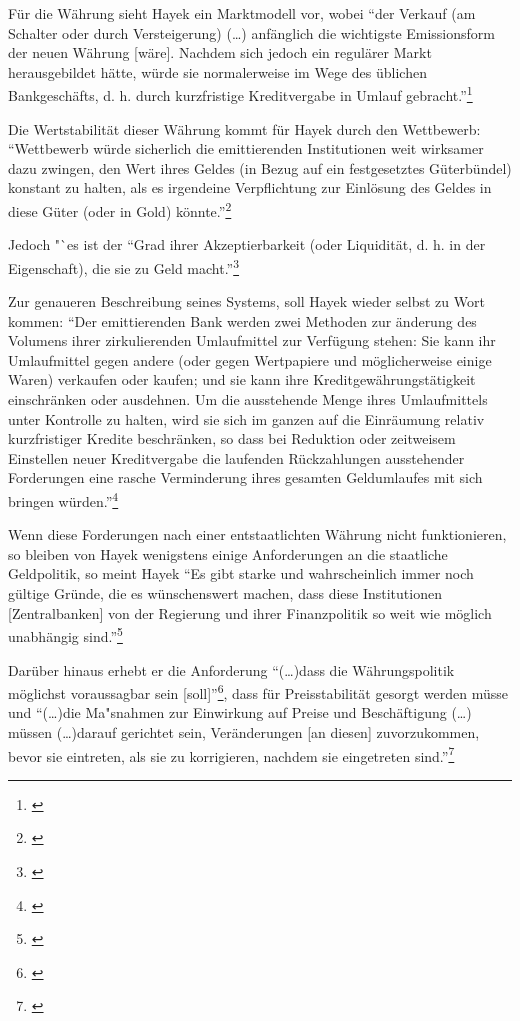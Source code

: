 \documentclass[
        onecolumn,
        a4paper,
        abstracton,
        parskip=half
        ,final
        ]{scrartcl}
\begin{document}
F{\"u}r die W{\"a}hrung sieht Hayek ein Marktmodell vor, wobei "`der Verkauf (am Schalter oder durch Versteigerung) (\ldots) anf{\"a}nglich die wichtigste Emissionsform der neuen W{\"a}hrung [w{\"a}re]. Nachdem sich jedoch ein regul{\"a}rer Markt herausgebildet h{\"a}tte, w{\"u}rde sie normalerweise im Wege des {\"u}blichen Bankgesch{\"a}fts, d. h. durch kurzfristige Kreditvergabe in Umlauf gebracht."'\footnote[70]{\citep*[S.31]{Hayek1977}}

Die Wertstabilit{\"a}t dieser W{\"a}hrung kommt f{\"u}r Hayek durch den Wettbewerb: "`Wettbewerb w{\"u}rde sicherlich die emittierenden Institutionen weit wirksamer dazu zwingen, den Wert ihres Geldes (in Bezug auf ein festgesetztes G{\"u}terb{\"u}ndel) konstant zu halten, als es irgendeine Verpflichtung zur Einl{\"o}sung des Geldes in diese G{\"u}ter (oder in Gold) k{\"o}nnte."'\footnote[71]{\citep*[S.32]{Hayek1977}}

Jedoch "`es ist der "`Grad ihrer Akzeptierbarkeit (oder Liquidit{\"a}t, d. h. in der Eigenschaft), die sie zu Geld macht."'\footnote[72]{\citep*[S.40]{Hayek1977}}

Zur genaueren Beschreibung seines Systems, soll Hayek wieder selbst zu Wort kommen: "`Der emittierenden Bank werden zwei Methoden zur {\"a}nderung des Volumens ihrer zirkulierenden Umlaufmittel zur Verf{\"u}gung stehen: Sie kann ihr Umlaufmittel gegen andere (oder gegen Wertpapiere und m{\"o}glicherweise einige Waren) verkaufen oder kaufen; und sie kann ihre Kreditgew{\"a}hrungst{\"a}tigkeit einschr{\"a}nken oder ausdehnen. Um die ausstehende Menge ihres Umlaufmittels unter Kontrolle zu halten, wird sie sich im ganzen auf die Einr{\"a}umung relativ kurzfristiger Kredite beschr{\"a}nken, so dass bei Reduktion oder zeitweisem Einstellen neuer Kreditvergabe die laufenden R{\"u}ckzahlungen ausstehender Forderungen eine rasche Verminderung ihres gesamten Geldumlaufes mit sich bringen w{\"u}rden."'\footnote[73]{\citep*[S.45]{Hayek1977}}

Wenn diese Forderungen nach einer entstaatlichten W{\"a}hrung nicht funktionieren, so bleiben von Hayek wenigstens einige Anforderungen an die staatliche Geldpolitik, so meint Hayek
"`Es gibt starke und wahrscheinlich immer noch g{\"u}ltige Gr{\"u}nde, die es w{\"u}nschenswert machen, dass diese Institutionen [Zentralbanken] von der Regierung und ihrer Finanzpolitik so weit wie m{\"o}glich unabh{\"a}ngig sind."'\footnote[74]{\citep*[S.412]{hayek1971}}

Dar{\"u}ber hinaus erhebt er die Anforderung "`(\ldots)dass die W{\"a}hrungspolitik m{\"o}glichst voraussagbar sein [soll]"'\footnote[75]{\citep*[S.420]{hayek1971}}, dass f{\"u}r Preisstabilit{\"a}t gesorgt werden m{\"u}sse und "`(\ldots)die Ma{"s}nahmen zur Einwirkung auf Preise und Besch{\"a}ftigung (\ldots) m{\"u}ssen (\ldots)darauf gerichtet sein, Ver{\"a}nderungen [an diesen] zuvorzukommen, bevor sie eintreten, als sie zu korrigieren, nachdem sie eingetreten sind."'\footnote[76]{\citep*[S.422]{hayek1971}}
\end{document}

